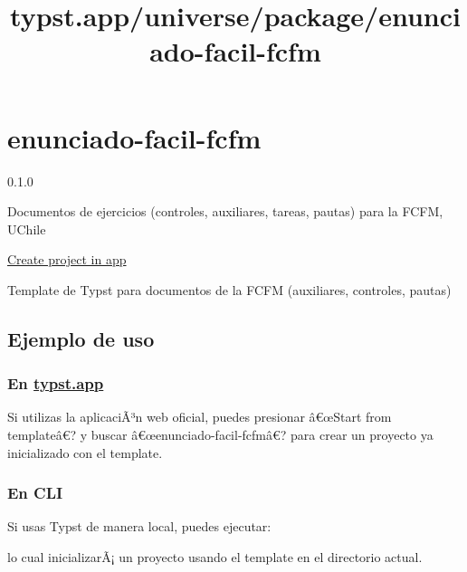 \title{typst.app/universe/package/enunciado-facil-fcfm}

\label{banner}
\label{template-thumbnail}

\section{enunciado-facil-fcfm}\label{enunciado-facil-fcfm}

{ 0.1.0 }

Documentos de ejercicios (controles, auxiliares, tareas, pautas) para la
FCFM, UChile

\href{/app?template=enunciado-facil-fcfm&version=0.1.0}{Create project
in app}

\label{readme}
Template de Typst para documentos de la FCFM (auxiliares, controles,
pautas)

\subsection{Ejemplo de uso}\label{ejemplo-de-uso}

\subsubsection{\texorpdfstring{En
\href{https://typst.app/}{typst.app}}{En typst.app}}\label{en-typst.app}

Si utilizas la aplicaciÃ³n web oficial, puedes presionar â€œStart from
templateâ€? y buscar â€œenunciado-facil-fcfmâ€? para crear un proyecto
ya inicializado con el template.

\subsubsection{En CLI}\label{en-cli}

Si usas Typst de manera local, puedes ejecutar:

\begin{Shaded}
\begin{Highlighting}[]
\end{Highlighting}
\end{Shaded}

lo cual inicializarÃ¡ un proyecto usando el template en el directorio
actual.

